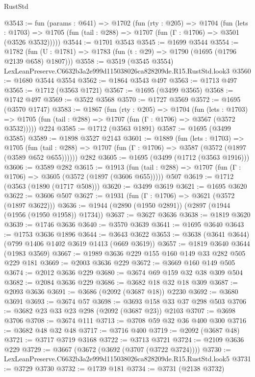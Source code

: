 \begin{lexlean}{RustStd}
\begin{coremodule}
@3543 := fun (params : @641) =>
  @1702
    (fun (rty : @205) =>
    @1704
      (fun (lets : @1703) =>
      @1705 (fun (tail : @288) => @1707 (fun (Γ : @1706) => @3501 (@3526 @3532)))))
@3544 := @1701 @3543
@3545 := @1699 @3544
@3554 := @1782 (fun (U : @1781) => @1783 (fun (t : @29) => @1790 (@1695 (@1796 @2139 @658) @1807)))
@3558 := @3519 (@3545 @3554) LexLeanPreserve.C6632b3a2e999d115038026ca828209de.R15.RustStd.look3
@3560 := @1680 @3544 @3554
@3562 := @1864 @3543 @497
@3563 := @1713 @497
@3565 := @1712 (@3563 @1721)
@3567 := @1695 (@3499 @3565)
@3568 := @1742 @497
@3569 := @3522 @3568
@3570 := @1727 @3569
@3572 := @1695 (@3570 @1747)
@3583 := @1867
    (fun (rty : @205) =>
    @1704
      (fun (lets : @1703) =>
      @1705 (fun (tail : @288) => @1707 (fun (Γ : @1706) => @3567 (@3572 @3532)))))
    @224
@3585 := @1712 (@3563 @1891)
@3587 := @1695 (@3499 @3585)
@3589 := @1898 @3527 @2143
@3601 := @1889
    (fun (lets : @1703) =>
    @1705 (fun (tail : @288) => @1707 (fun (Γ : @1706) => @3587 (@3572 (@1897 (@3589 @652 @655))))))
    @282
@3605 := @1695 (@3499 (@1712 (@3563 @1916)))
@3606 := @3589 @282
@3615 := @1913
    (fun (tail : @288) => @1707 (fun (Γ : @1706) => @3605 (@3572 (@1897 (@3606 @655)))))
    @507
@3619 := @1712 (@3563 (@1890 (@1717 @508)))
@3620 := @3499 @3619
@3621 := @1695 @3620
@3622 := @3606 @507
@3627 := @1931 (fun (Γ : @1706) => @3621 (@3572 (@1897 @3622)))
@3636 := @1944 (@2890 (@1950 @2891)) (@2897 (@1944 (@1956 (@1950 @1958)) @1734))
@3637 := @3627 @3636
@3638 := @1819 @3620
@3639 := @1746 @3636
@3640 := @3570 @3639
@3641 := @1695 @3640
@3643 := @1753 @3636 @1896
@3644 := @3643 @3622
@3653 := @3638 (@3641 @3644) (@799 @1406 @1402 @3619 @1413 (@669 @3619))
@3657 := @1819 @3640 @3644 (@1983 @3569)
@3667 := @1989 @3636 @229 @155 @160 @149 @33 @282 @505 @229 @181
@3669 := @2003 @3636 @229
@3672 := @3669 @160 @149 @505
@3674 := @2012 @3636 @229
@3680 := @3674 @69 @159 @32 @38 @309 @504
@3682 := @2084 @3636 @229
@3686 := @3682 @18 @32 @18 @309
@3687 := @2093 @3636
@3691 := @3686 (@2092 (@3687 @18)) @2230
@3692 := @3680 @3691
@3693 := @3674 @57
@3698 := @3693 @158 @33 @37 @298 @503
@3706 := @3682 @23 @33 @23 @298 (@2092 (@3687 @23)) @2103
@3707 := @3698 @3706
@3708 := @3674 @111
@3713 := @3708 @59 @32 @36 @400 @300
@3716 := @3682 @48 @32 @48
@3717 := @3716 @400
@3719 := @2092 (@3687 @48)
@3721 := @3717 @3719 @3168
@3722 := @3713 @3721
@3724 := @2109 @3636 @229
@3729 := @3667 (@3672 (@3692 (@3707 (@3722 @3724))))
@3730 := LexLeanPreserve.C6632b3a2e999d115038026ca828209de.R15.RustStd.look5
@3731 := @3729 @3730
@3732 := @1739 @181
@3734 := @3731 (@2138 @3732)

\end{coremodule}
\end{lexlean}
